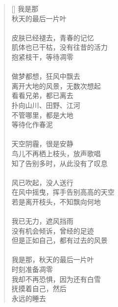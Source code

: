 \renewcommand{\poemtoc}{section}
\settowidth{\versewidth}{无所事事，等待凋零}
\begin{verse}[\versewidth]
我是那\\
秋天的最后一片叶\\
~\\
皮肤已经褪去，青春的记忆\\
肌体也已干枯，没有往昔的活力\\
抱紧枝干，等待凋零\\
~\\
做梦都想，狂风中飘去\\
离开大地的风景，无数次想起\\
看看兄弟，都已离去\\
扑向山川、田野、江河\\
不管哪里，都是大地\\
等待化作春泥\\
~\\
天空阴霾，很是安静\\
鸟儿不再栖上枝头，放声歌唱\\
知了告别多时，从此没有了叹息\\
~\\
风已吹起，没人送行\\
在风中摇曳，挥手告别高高的天空\\
若是离开枝头，不知飘向何地\\
~\\
我已无力，遮风挡雨\\
没有机会倾诉，曾经的足迹\\
但是正如自己，都有过去的风景\\
~\\
我是那，秋天的最后一片叶\\
时刻准备凋零\\
我却不再恐惧，因为还有白雪\\
抚摸着自己，然后\\
永远的睡去
\end{verse}
